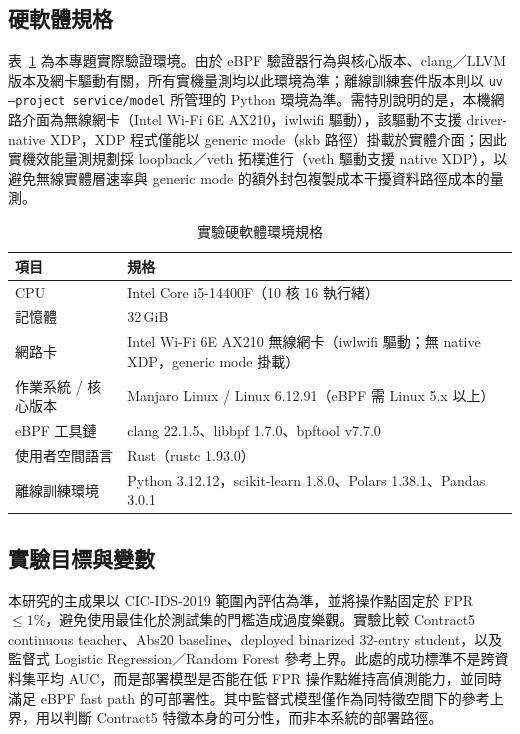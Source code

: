 \documentclass[12pt, a4paper, fontset=none]{ctexart}
\newcommand{\code}[1]{\texttt{#1}}
\begin{document}
\subsection{硬軟體規格}
表~\ref{tab:spec} 為本專題實際驗證環境。由於 eBPF 驗證器行為與核心版本、clang／LLVM 版本及網卡驅動有關，所有實機量測均以此環境為準；離線訓練套件版本則以 \code{uv --project service/model} 所管理的 Python 環境為準。需特別說明的是，本機網路介面為無線網卡（Intel Wi-Fi 6E AX210，iwlwifi 驅動），該驅動不支援 driver-native XDP，XDP 程式僅能以 generic mode（skb 路徑）掛載於實體介面；因此實機效能量測規劃採 loopback／veth 拓樸進行（veth 驅動支援 native XDP），以避免無線實體層速率與 generic mode 的額外封包複製成本干擾資料路徑成本的量測。
\begin{table}[H]
  \centering
  \caption{實驗硬軟體環境規格}
  \label{tab:spec}
  \renewcommand{\arraystretch}{1.3}
  \begin{tabularx}{\textwidth}{l X}
    \toprule
    \textbf{項目} & \textbf{規格} \\
    \midrule
    CPU              & Intel Core i5-14400F（10 核 16 執行緒） \\
    記憶體           & 32\,GiB \\
    網路卡           & Intel Wi-Fi 6E AX210 無線網卡（iwlwifi 驅動；無 native XDP，generic mode 掛載） \\
    作業系統 / 核心版本 & Manjaro Linux / Linux 6.12.91（eBPF 需 Linux 5.x 以上） \\
    eBPF 工具鏈      & clang 22.1.5、libbpf 1.7.0、bpftool v7.7.0 \\
    使用者空間語言   & Rust（rustc 1.93.0） \\
    離線訓練環境     & Python 3.12.12，scikit-learn 1.8.0、Polars 1.38.1、Pandas 3.0.1 \\
    \bottomrule
  \end{tabularx}
\end{table}

\subsection{實驗目標與變數}
本研究的主成果以 CIC-IDS-2019 範圍內評估為準，並將操作點固定於 FPR $\leq 1\%$，避免使用最佳化於測試集的門檻造成過度樂觀。實驗比較 Contract5 continuous teacher、Abs20 baseline、deployed binarized 32-entry student，以及監督式 Logistic Regression／Random Forest 參考上界。此處的成功標準不是跨資料集平均 AUC，而是部署模型是否能在低 FPR 操作點維持高偵測能力，並同時滿足 eBPF fast path 的可部署性。其中監督式模型僅作為同特徵空間下的參考上界，用以判斷 Contract5 特徵本身的可分性，而非本系統的部署路徑。
\end{document}
